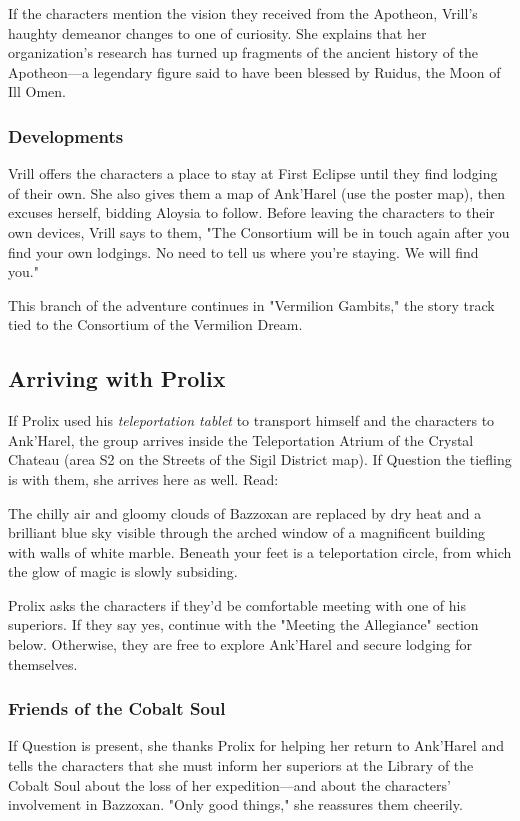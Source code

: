 \documentclass[10pt,a4paper,twoside,fancy,bg=print,twocolumn,openany,nodeprecatedcode]{dndbook}
\begin{document}
If the characters mention the vision they received from the Apotheon, Vrill's haughty demeanor changes to one of curiosity. She explains that her organization's research has turned up fragments of the ancient history of the Apotheon—a legendary figure said to have been blessed by Ruidus, the Moon of Ill Omen.

\subsubsection{Developments}
Vrill offers the characters a place to stay at First Eclipse until they find lodging of their own. She also gives them a map of Ank'Harel (use the poster map), then excuses herself, bidding Aloysia to follow. Before leaving the characters to their own devices, Vrill says to them, "The Consortium will be in touch again after you find your own lodgings. No need to tell us where you're staying. We will find you."

This branch of the adventure continues in "Vermilion Gambits," the story track tied to the Consortium of the Vermilion Dream.

\subsection{Arriving with Prolix}
If Prolix used his \textit{teleportation tablet} to transport himself and the characters to Ank'Harel, the group arrives inside the Teleportation Atrium of the Crystal Chateau (area S2 on the Streets of the Sigil District map). If Question the tiefling is with them, she arrives here as well. Read:

\begin{DndReadAloud}{}
The chilly air and gloomy clouds of Bazzoxan are replaced by dry heat and a brilliant blue sky visible through the arched window of a magnificent building with walls of white marble. Beneath your feet is a teleportation circle, from which the glow of magic is slowly subsiding.

\end{DndReadAloud}

Prolix asks the characters if they'd be comfortable meeting with one of his superiors. If they say yes, continue with the "Meeting the Allegiance" section below. Otherwise, they are free to explore Ank'Harel and secure lodging for themselves.

\subsubsection{Friends of the Cobalt Soul}
If Question is present, she thanks Prolix for helping her return to Ank'Harel and tells the characters that she must inform her superiors at the Library of the Cobalt Soul about the loss of her expedition—and about the characters' involvement in Bazzoxan. "Only good things," she reassures them cheerily.
\end{document}
